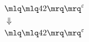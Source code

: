 \documentclass{article}
\begin{document}
\tiny\begin{align*}
&\quot{42}^{\varepsilon}\\ 
&\Downarrow\\ 
&\quot{42}^{\varepsilon}\\ 
\end{align*}
\end{document}

